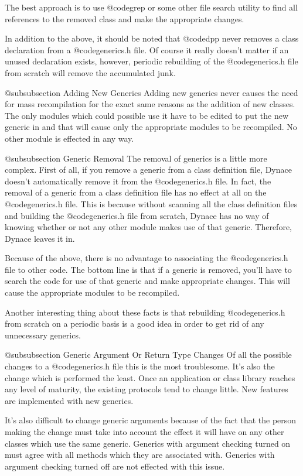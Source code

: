 The best approach is to use @code{grep} or some other file search utility
to find all references to the removed class and make the appropriate
changes.

In addition to the above, it should be noted that @code{dpp} never
removes a class declaration from a @code{generics.h} file.  Of
course it really doesn't matter if an unused declaration exists,
however, periodic rebuilding of the @code{generics.h} file
from scratch will remove the accumulated junk.

@subsubsection Adding New Generics
Adding new generics never causes the need for mass recompilation for the
exact same reasons as the addition of new classes.  The only modules
which could possible use it have to be edited to put the new generic in
and that will cause only the appropriate modules to be recompiled.
No other module is effected in any way.

@subsubsection Generic Removal
The removal of generics is a little more complex.  First of all,
if you remove a generic from a class definition file, Dynace
doesn't automatically remove it from the @code{generics.h} file.
In fact, the removal of a generic from a class definition file
has no effect at all on the @code{generics.h} file.  This is because
without scanning all the class definition files and building the
@code{generics.h} file from scratch, Dynace has no way of knowing
whether or not any other module makes use of that generic.
Therefore, Dynace leaves it in.

Because of the above, there is no advantage to associating the
@code{generics.h} file to other code.  The bottom line is that
if a generic is removed, you'll have to search the code for
use of that generic and make appropriate changes.  This will
cause the appropriate modules to be recompiled.

Another interesting thing about these facts is that rebuilding
@code{generics.h} from scratch on a periodic basis is a good idea in
order to get rid of any unnecessary generics.

@subsubsection Generic Argument Or Return Type Changes
Of all the possible changes to a @code{generics.h} file this is the
most troublesome.  It's also the change which is performed
the least.  Once an application or class library reaches any level
of maturity, the existing protocols tend to change little.  New
features are implemented with new generics.

It's also difficult to change generic arguments because of the fact that
the person making the change must take into account the effect it will
have on any other classes which use the same generic.  Generics with
argument checking turned on must agree with all methods which they are
associated with.  Generics with argument checking turned off are not
effected with this issue.

